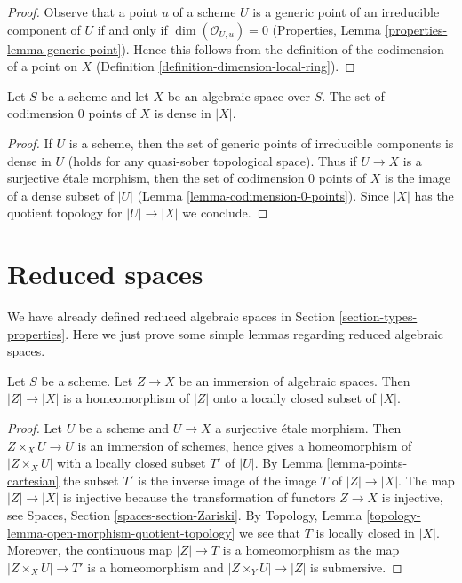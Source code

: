\begin{proof}
Observe that a point $u$ of a scheme $U$ is a generic point of an
irreducible component of $U$ if and only if $\dim(\mathcal{O}_{U, u}) = 0$
(Properties, Lemma \ref{properties-lemma-generic-point}).
Hence this follows from the definition of the codimension of a
point on $X$ (Definition \ref{definition-dimension-local-ring}).
\end{proof}

\begin{lemma}
\label{lemma-codimension-0-points-dense}
Let $S$ be a scheme and let $X$ be an algebraic space over $S$.
The set of codimension $0$ points of $X$ is dense in $|X|$.
\end{lemma}

\begin{proof}
If $U$ is a scheme, then the set of generic points of irreducible
components is dense in $U$ (holds for any quasi-sober topological space).
Thus if $U \to X$ is a surjective \'etale morphism, then the set
of codimension $0$ points of $X$ is the image of a dense subset of
$|U|$ (Lemma \ref{lemma-codimension-0-points}). Since $|X|$ has the
quotient topology for $|U| \to |X|$ we conclude.
\end{proof}





\section{Reduced spaces}
\label{section-reduced}

\noindent
We have already defined reduced algebraic spaces in
Section \ref{section-types-properties}.
Here we just prove some simple lemmas regarding reduced algebraic
spaces.

\begin{lemma}
\label{lemma-subspace-induced-topology}
Let $S$ be a scheme. Let $Z \to X$ be an immersion of algebraic spaces.
Then $|Z| \to |X|$ is a homeomorphism of $|Z|$ onto a locally closed subset
of $|X|$.
\end{lemma}

\begin{proof}
Let $U$ be a scheme and $U \to X$ a surjective \'etale morphism.
Then $Z \times_X U \to U$ is an immersion of schemes, hence gives a
homeomorphism of $|Z \times_X U|$ with a locally closed subset $T'$
of $|U|$. By Lemma \ref{lemma-points-cartesian} the subset
$T'$ is the inverse image of the image $T$ of $|Z| \to |X|$.
The map $|Z| \to |X|$ is injective because the transformation of
functors $Z \to X$ is injective, see
Spaces, Section \ref{spaces-section-Zariski}. By
Topology, Lemma \ref{topology-lemma-open-morphism-quotient-topology}
we see that $T$ is locally closed in $|X|$. Moreover, the continuous
map $|Z| \to T$ is a homeomorphism as the map $|Z \times_X U| \to T'$
is a homeomorphism and $|Z \times_Y U| \to |Z|$ is submersive.
\end{proof}

